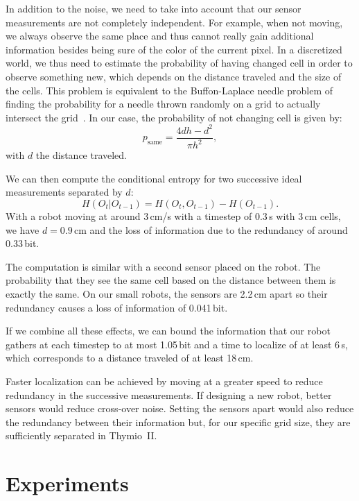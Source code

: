 \documentclass[letterpaper, 10pt, conference]{ieeeconf}
\begin{document}
In addition to the noise, we need to take into account that our sensor measurements are not completely independent.
For example, when not moving, we always observe the same place and thus cannot really gain additional information besides being sure of the color of the current pixel.
In a discretized world, we thus need to estimate the probability of having changed cell in order to observe something new, which depends on the distance traveled and the size of the cells.
This problem is equivalent to the Buffon-Laplace needle problem of finding the probability for a needle thrown randomly on a grid to actually intersect the grid~\cite{laplace1820prob}.
In our case, the probability of not changing cell is given by:
\begin{displaymath}
	p_\mathrm{same} = \frac{4d h - d^2}{\pi h^2},
\end{displaymath}
with $d$ the distance traveled.

We can then compute the conditional entropy for two successive ideal measurements separated by $d$:
\begin{displaymath}
	H(O_t | O_{t-1}) = H(O_t, O_{t-1}) - H(O_{t-1}).
\end{displaymath}
With a robot moving at around 3\,cm/s with a timestep of 0.3\,s with 3\,cm cells, we have $d=0.9$\,cm and the loss of information due to the redundancy of around 0.33\,bit.

The computation is similar with a second sensor placed on the robot.
The probability that they see the same cell based on the distance between them is exactly the same.
On our small robots, the sensors are 2.2\,cm apart so their redundancy causes a loss of information of 0.041\,bit.

If we combine all these effects, we can bound the information that our robot gathers at each timestep to at most 1.05\,bit and a time to localize of at least 6\,s, which corresponds to a distance traveled of at least 18\,cm.

Faster localization can be achieved by moving at a greater speed to reduce redundancy in the successive measurements.
If designing a new robot, better sensors would reduce cross-over noise.
Setting the sensors apart would also reduce the redundancy between their information but, for our specific grid size, they are sufficiently separated in Thymio~II.


\section{Experiments}
\end{document}
